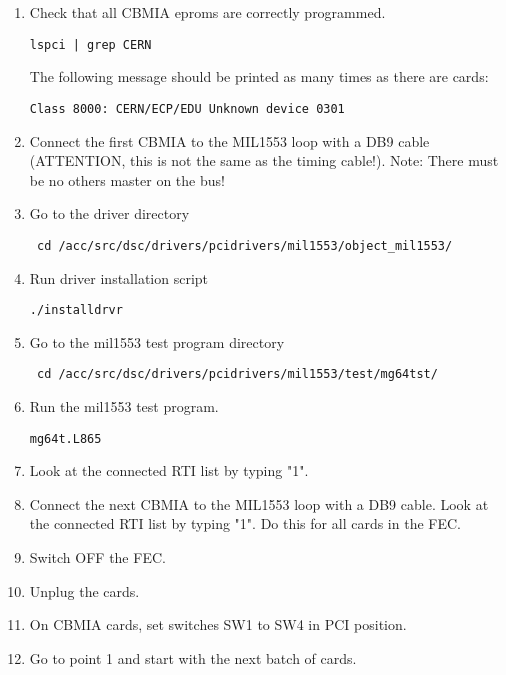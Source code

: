 \documentclass[11pt,a4paper]{article}
\begin{document}
\begin{enumerate}
	\item Check that all CBMIA eproms are correctly programmed.
				\begin{verbatim}lspci | grep CERN\end{verbatim}
				The following message should be printed as many times as there are cards:
				\begin{verbatim}Class 8000: CERN/ECP/EDU Unknown device 0301\end{verbatim}
	\item Connect the first CBMIA to the MIL1553 loop with a DB9 cable (ATTENTION, this is not the same as the timing cable!).
				\newline Note: There must be no others master on the bus!
	\item Go to the driver directory 
				\begin{verbatim} cd /acc/src/dsc/drivers/pcidrivers/mil1553/object_mil1553/ \end{verbatim}
	\item Run driver installation script \begin{verbatim}./installdrvr\end{verbatim}
	\item Go to the mil1553 test program directory 
				\begin{verbatim} cd /acc/src/dsc/drivers/pcidrivers/mil1553/test/mg64tst/ \end{verbatim}
	\item Run the mil1553 test program.
	      \begin{verbatim}mg64t.L865\end{verbatim}
	\item Look at the connected RTI list by typing "1".
	\item Connect the next CBMIA to the MIL1553 loop with a DB9 cable.
				\newline Look at the connected RTI list by typing "1".
				\newline Do this for all cards in the FEC.
	\item Switch OFF the FEC.
	\item Unplug the cards.
	\item On CBMIA cards, set switches SW1 to SW4 in PCI position.
	\item Go to point 1 and start with the next batch of cards.
\end{enumerate}
\end{document}
